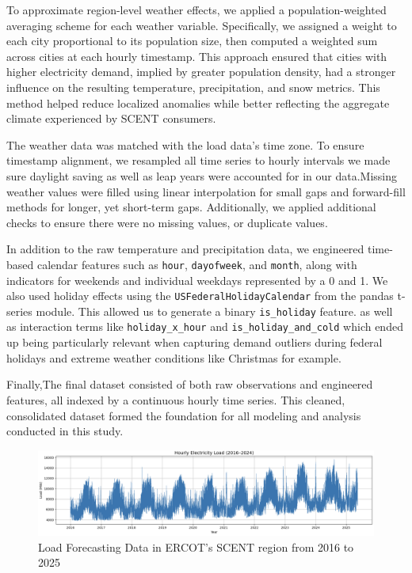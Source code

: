 \documentclass[final,numbered]{ifacconf}
\begin{document}
To approximate region-level weather effects, we applied a population-weighted averaging scheme for each weather variable. Specifically, we assigned a weight to each city proportional to its population size, then computed a weighted sum across cities at each hourly timestamp. This approach ensured that cities with higher electricity demand, implied by greater population density, had a stronger influence on the resulting temperature, precipitation, and snow metrics. This method helped reduce localized anomalies while better reflecting the aggregate climate experienced by SCENT consumers.

The weather data was matched with the load data’s time zone. To ensure timestamp alignment, we resampled all time series to hourly intervals we made sure daylight saving as well as leap years were accounted for in our data.Missing weather values were filled using linear interpolation for small gaps and forward-fill methods for longer, yet short-term gaps. Additionally, we applied additional checks to ensure there were no missing values, or duplicate values.

In addition to the raw temperature and precipitation data, we engineered time-based calendar features such as \texttt{hour}, \texttt{dayofweek}, and \texttt{month}, along with  indicators for weekends and individual weekdays represented by a 0 and 1. We also used holiday effects using the \texttt{USFederalHolidayCalendar} from the pandas t-series module. This allowed us to generate a binary \texttt{is_holiday} feature. as well as interaction terms like \texttt{holiday_x_hour} and \texttt{is_holiday_and_cold} which ended up being particularly relevant when capturing demand outliers during federal holidays and extreme weather conditions like Christmas for example.

Finally,The final dataset consisted of both raw observations and engineered features, all indexed by a continuous hourly time series. This cleaned, consolidated dataset formed the foundation for all modeling and analysis conducted in this study.




\begin{figure}[htbp]
    \centering
    \includegraphics[width=0.9\linewidth]{hourly.png} 
    \caption{Load Forecasting Data in ERCOT's SCENT region from 2016 to 2025}
    \label{fig:load_patterns}
\end{figure}
\end{document}

